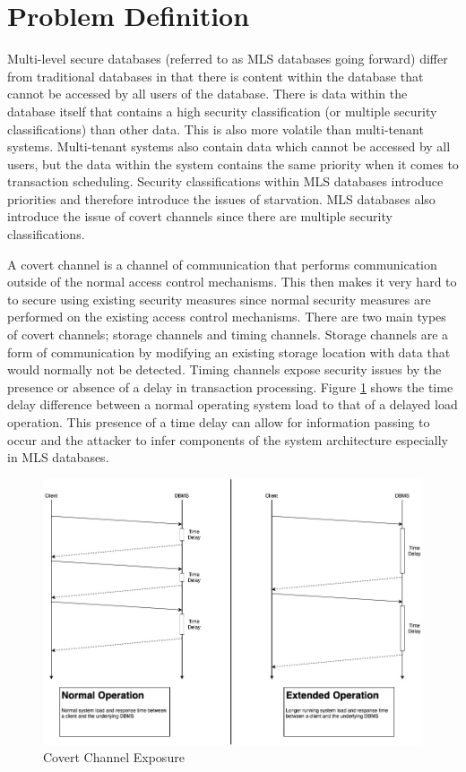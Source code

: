 \section{Problem Definition}
\label{mls:problem_definition}

Multi-level secure databases (referred to as MLS databases going forward) differ from traditional databases in that there is content within the database that cannot be accessed by all users of the database. There is data within the database itself that contains a high security classification (or multiple security classifications) than other data. This is also more volatile than multi-tenant systems. Multi-tenant systems also contain data which cannot be accessed by all users, but the data within the system contains the same priority when it comes to transaction scheduling. Security classifications within MLS databases introduce priorities and therefore introduce the issues of starvation. MLS databases also introduce the issue of covert channels since there are multiple security classifications. 

A covert channel is a channel of communication that performs communication outside of the normal access control mechanisms. This then makes it very hard to to secure using existing security measures since normal security measures are performed on the existing access control mechanisms. There are two main types of covert channels; storage channels and timing channels. Storage channels are a form of communication by modifying an existing storage location with data that would normally not be detected. Timing channels expose security issues by the presence or absence of a delay in transaction processing. Figure \ref{fig:covert_channel_exposure} shows the time delay difference between a normal operating system load to that of a delayed load operation. This presence of a time delay can allow for information passing to occur and the attacker to infer components of the system architecture especially in MLS databases.

\begin{figure}
\centering
\includegraphics[scale=0.45]{images/CovertTimingChannel.jpg}
\caption{Covert Channel Exposure}
\label{fig:covert_channel_exposure}
\end{figure}

